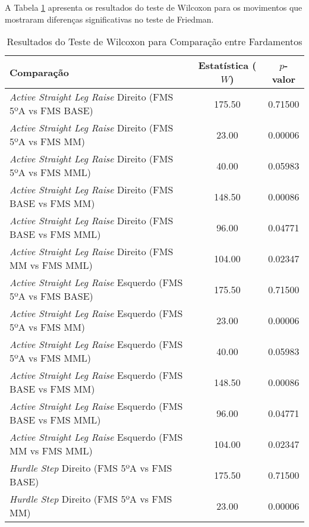         A Tabela \ref{tab:wilcoxon} apresenta os resultados do teste de Wilcoxon para os movimentos que mostraram diferenças significativas no teste de Friedman.

        \begin{table}[H]
            \centering
            \caption{Resultados do Teste de Wilcoxon para Comparação entre Fardamentos}
            \label{tab:wilcoxon}
            \begin{tabular}{lcc}
                \hline
                \textbf{Comparação} & \textbf{Estatística ($W$)} & \textbf{$p$-valor} \\
                \hline
                \textit{Active Straight Leg Raise} Direito (FMS 5ºA vs FMS BASE) & 175.50 & 0.71500 \\
                \textit{Active Straight Leg Raise} Direito (FMS 5ºA vs FMS MM) & 23.00 & 0.00006 \\
                \textit{Active Straight Leg Raise} Direito (FMS 5ºA vs FMS MML) & 40.00 & 0.05983 \\
                \textit{Active Straight Leg Raise} Direito (FMS BASE vs FMS MM) & 148.50 & 0.00086 \\
                \textit{Active Straight Leg Raise} Direito (FMS BASE vs FMS MML) & 96.00 & 0.04771 \\
                \textit{Active Straight Leg Raise} Direito (FMS MM vs FMS MML) & 104.00 & 0.02347 \\
                \textit{Active Straight Leg Raise} Esquerdo (FMS 5ºA vs FMS BASE) & 175.50 & 0.71500 \\
                \textit{Active Straight Leg Raise} Esquerdo (FMS 5ºA vs FMS MM) & 23.00 & 0.00006 \\
                \textit{Active Straight Leg Raise} Esquerdo (FMS 5ºA vs FMS MML) & 40.00 & 0.05983 \\
                \textit{Active Straight Leg Raise} Esquerdo (FMS BASE vs FMS MM) & 148.50 & 0.00086 \\
                \textit{Active Straight Leg Raise} Esquerdo (FMS BASE vs FMS MML) & 96.00 & 0.04771 \\
                \textit{Active Straight Leg Raise} Esquerdo (FMS MM vs FMS MML) & 104.00 & 0.02347 \\
                \textit{Hurdle Step} Direito (FMS 5ºA vs FMS BASE) & 175.50 & 0.71500 \\
                \textit{Hurdle Step} Direito (FMS 5ºA vs FMS MM) & 23.00 & 0.00006 \\

\end{tabular}
\end{table}
